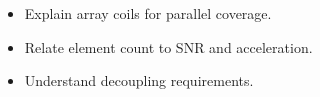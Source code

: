 \begin{objectives}
\begin{itemize}[leftmargin=1.4em,itemsep=2pt]
\item Explain array coils for parallel coverage.
\item Relate element count to SNR and acceleration.
\item Understand decoupling requirements.
\end{itemize}
\end{objectives}
